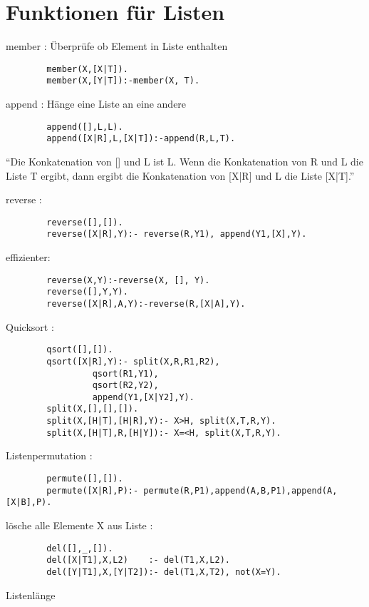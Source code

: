 \section{Funktionen für Listen}
\begin{compactitem}
	\item member : Überprüfe ob Element in Liste enthalten
		\begin{lstlisting}
		member(X,[X|T]).
		member(X,[Y|T]):-member(X, T).
		\end{lstlisting}
	\item append : Hänge eine Liste an eine andere
		\begin{lstlisting}
		append([],L,L).
		append([X|R],L,[X|T]):-append(R,L,T).
		\end{lstlisting}
		\enquote{Die Konkatenation von [] und L ist L. Wenn die Konkatenation von R und L die Liste T ergibt, dann ergibt die Konkatenation von [X|R] und L die Liste [X|T].}
	\item reverse : 		
		\begin{lstlisting}
		reverse([],[]).
		reverse([X|R],Y):- reverse(R,Y1), append(Y1,[X],Y).
		\end{lstlisting}
		effizienter:
		\begin{lstlisting}
		reverse(X,Y):-reverse(X, [], Y).
		reverse([],Y,Y).
		reverse([X|R],A,Y):-reverse(R,[X|A],Y).
		\end{lstlisting}
	\item Quicksort :
		\begin{lstlisting}
		qsort([],[]).
		qsort([X|R],Y):- split(X,R,R1,R2),
				 qsort(R1,Y1),
				 qsort(R2,Y2),
				 append(Y1,[X|Y2],Y).
		split(X,[],[],[]).
		split(X,[H|T],[H|R],Y):- X>H, split(X,T,R,Y).
		split(X,[H|T],R,[H|Y]):- X=<H, split(X,T,R,Y).
		\end{lstlisting}
	\item Listenpermutation :
		\begin{lstlisting}
		permute([],[]).
		permute([X|R],P):- permute(R,P1),append(A,B,P1),append(A,[X|B],P).
		\end{lstlisting}
	\item lösche alle Elemente X aus Liste :
		\begin{lstlisting}
		del([],_,[]).
		del([X|T1],X,L2)    :- del(T1,X,L2).
		del([Y|T1],X,[Y|T2]):- del(T1,X,T2), not(X=Y).
		\end{lstlisting}	
	\item Listenlänge 

\end{compactitem}

